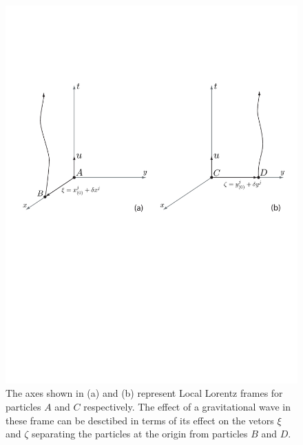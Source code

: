 \begin{figure}[p]
\begin{center}
\includegraphics[width=\linewidth]{figures/inspiral/deviation}
\end{center}
\caption[Effect of a Gravitational Wave on Test Particles]{%
\label{f:particles}%
The axes shown in (a) and (b) represent Local Lorentz frames for particles $A$
and $C$ respectively. The effect of a gravitational wave in these frame can be
desctibed in terms of its effect on the vetors $\xi$ and $\zeta$ separating
the particles at the origin from particles $B$ and $D$.
}
\end{figure}

